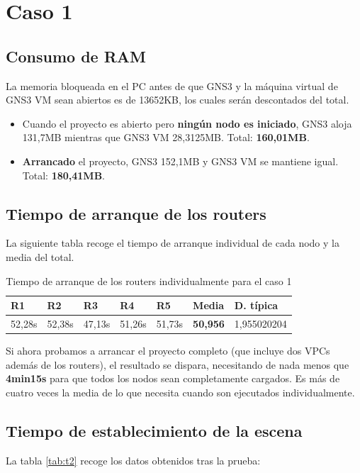 \section{Caso 1}
\subsection{Consumo de RAM}
La memoria bloqueada en el PC antes de que GNS3 y la máquina virtual de GNS3 VM sean abiertos es de 13652KB, los cuales serán descontados del total.

\begin{itemize}
\item Cuando el proyecto es abierto pero \textbf{ningún nodo es iniciado}, GNS3 aloja 131,7MB mientras que GNS3 VM 28,3125MB. Total: \textbf{160,01MB}.
\item \textbf{Arrancado} el proyecto, GNS3 152,1MB y GNS3 VM se mantiene igual. Total: \textbf{180,41MB}.
\end{itemize}

\subsection{Tiempo de arranque de los routers}
La siguiente tabla recoge el tiempo de arranque individual de cada nodo y la media del total.

\begin{table}[H]
\centering
\begin{tabular}{|l|l|l|l|l|l|l|}
\hline
\textbf{R1} & \textbf{R2} 	& \textbf{R3} 	& \textbf{R4} 	& \textbf{R5} 	& \textbf{Media}	&	\textbf{D. típica}	\\ \hline
52,28s		& 52,38s		& 47,13s		& 51,26s		& 51,73s		& \textbf{50,956}	&	1,955020204			\\ \hline
\end{tabular}
\caption{Tiempo de arranque de los routers individualmente para el caso 1}
\label{tab:t1}
\end{table}

Si ahora probamos a arrancar el proyecto completo (que incluye dos VPCs además de los routers), el resultado se dispara, necesitando de nada menos que \textbf{4min15s} para que todos los nodos sean completamente cargados. Es más de cuatro veces la media de lo que necesita cuando son ejecutados individualmente.

\subsection{Tiempo de establecimiento de la escena}
La tabla \ref{tab:t2} recoge los datos obtenidos tras la prueba:

